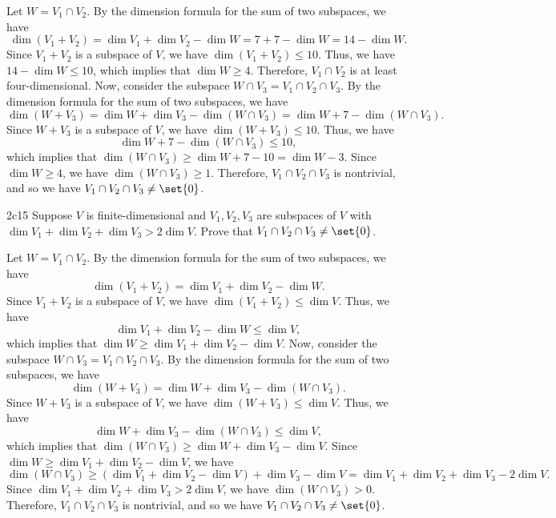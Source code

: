 \begin{sol}
    Let $W = V_1 \cap V_2$.
	By the dimension formula for the sum of two subspaces, we have
    \[
    	\dim(V_1 + V_2) = \dim V_1 + \dim V_2 - \dim W = 7 + 7 - \dim W = 14 - \dim W.
    \]
    Since $V_1 + V_2$ is a subspace of $V$, we have $\dim(V_1 + V_2) \leq 10$.
	Thus, we have $14 - \dim W \leq 10$, which implies that $\dim W \geq 4$.
	Therefore, $V_1 \cap V_2$ is at least four-dimensional.
	Now, consider the subspace $W \cap V_3 = V_1 \cap V_2 \cap V_3$.
	By the dimension formula for the sum of two subspaces, we have
    \[
    	\dim(W + V_3) = \dim W + \dim V_3 - \dim(W \cap V_3) = \dim W + 7 - \dim(W \cap V_3).
    \]
    Since $W + V_3$ is a subspace of $V$, we have $\dim(W + V_3) \leq 10$.
	Thus, we have
    \[
    	\dim W + 7 - \dim(W \cap V_3) \leq 10,
    \]
    which implies that $\dim(W \cap V_3) \geq \dim W + 7 - 10 = \dim W - 3$.
	Since $\dim W \geq 4$, we have $\dim(W \cap V_3) \geq 1$.
	Therefore, $V_1 \cap V_2 \cap V_3$ is nontrivial, and so we have $V_1 \cap V_2 \cap V_3 \neq \set{0}$.
\end{sol}

\begin{exercise}{2c15}
    Suppose $V$ is finite-dimensional and $V_1, V_2, V_3$ are subspaces of $V$ with $\dim V_1 + \dim V_2 + \dim V_3 > 2 \dim V$.
	Prove that $V_1 \cap V_2 \cap V_3 \neq \set{0}$.
\end{exercise}

\begin{sol}
    Let $W = V_1 \cap V_2$.
	By the dimension formula for the sum of two subspaces, we have
    \[
    	\dim(V_1 + V_2) = \dim V_1 + \dim V_2 - \dim W.
    \]
    Since $V_1 + V_2$ is a subspace of $V$, we have $\dim(V_1 + V_2) \leq \dim V$.
	Thus, we have
    \[
    	\dim V_1 + \dim V_2 - \dim W \leq \dim V,
    \]
    which implies that $\dim W \geq \dim V_1 + \dim V_2 - \dim V$.
	Now, consider the subspace $W \cap V_3 = V_1 \cap V_2 \cap V_3$.
	By the dimension formula for the sum of two subspaces, we have
    \[
    	\dim(W + V_3) = \dim W + \dim V_3 - \dim(W \cap V_3).
    \]
    Since $W + V_3$ is a subspace of $V$, we have $\dim(W + V_3) \leq \dim V$.
	Thus, we have
    \[
    	\dim W + \dim V_3 - \dim(W \cap V_3) \leq \dim V,
    \]
    which implies that $\dim(W \cap V_3) \geq \dim W + \dim V_3 - \dim V$.
	Since $\dim W \geq \dim V_1 + \dim V_2 - \dim V$, we have
    \[
    	\dim(W \cap V_3) \geq (\dim V_1 + \dim V_2 - \dim V) + \dim V_3 - \dim V = \dim V_1 + \dim V_2 + \dim V_3 - 2 \dim V.
    \]
    Since $\dim V_1 + \dim V_2 + \dim V_3 > 2 \dim V$, we have $\dim(W \cap V_3) > 0$.
	Therefore, $V_1 \cap V_2 \cap V_3$ is nontrivial, and so we have $V_1 \cap V_2 \cap V_3 \neq \set{0}$.
\end{sol}

